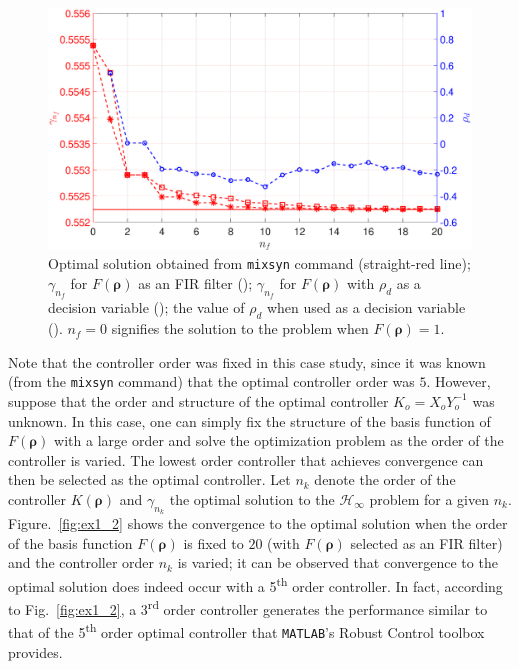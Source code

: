 \documentclass[letterpaper, 10 pt, conference]{ieeeconf}  %
\begin{document}
\begin{figure}
\centering
\includegraphics[width=\columnwidth]{../pics/gamma_convergence_F_var.eps}
\caption{Optimal solution obtained from \texttt{mixsyn} command (straight-red line); $\gamma_{n_f}$ for $F(\bm{\rho})$ as an FIR filter ({\color{red}{- -$\square$- -}});  $\gamma_{n_f}$ for $F(\bm{\rho})$ with $\rho_d$ as a decision variable ({\color{red}{- -$*$- -}}); the value of $\rho_d$ when used as a decision variable  ({\color{blue}{- -$\circ$- -}}). $n_f = 0$ signifies the solution to the problem when $F(\bm{\rho})=1$.}
\label{fig:ex1_1}
\end{figure}

Note that the controller order was fixed in this case study, since it was known (from the \texttt{mixsyn} command) that the optimal controller order was $5$. However, suppose that the order and structure of the optimal controller $K_o = X_oY_o^{-1}$ was unknown. In this case, one can simply fix the structure of the basis function of $F(\bm{\rho})$ with a large order and solve the optimization problem as the order of the controller is varied. The lowest order controller that achieves convergence can then be selected as the optimal controller. Let $n_k$ denote the order of the controller $K(\bm{\rho})$ and $\gamma_{n_k}$ the optimal solution to the $\mathcal{H}_{\infty}$ problem for a given $n_k$. Figure.~\ref{fig:ex1_2} shows the convergence to the optimal solution when the order of the basis function $F(\bm{\rho})$ is fixed to $20$ (with $F(\bm{\rho})$ selected as an FIR filter) and the controller order $n_k$ is varied; it can be observed that convergence to the optimal solution does indeed occur with a 5\textsuperscript{th}  order controller. In fact, according to Fig.~\ref{fig:ex1_2}, a 3\textsuperscript{rd} order controller generates the performance similar to that of the 5\textsuperscript{th} order optimal controller that \texttt{MATLAB}'s Robust Control toolbox provides. 
\end{document}
